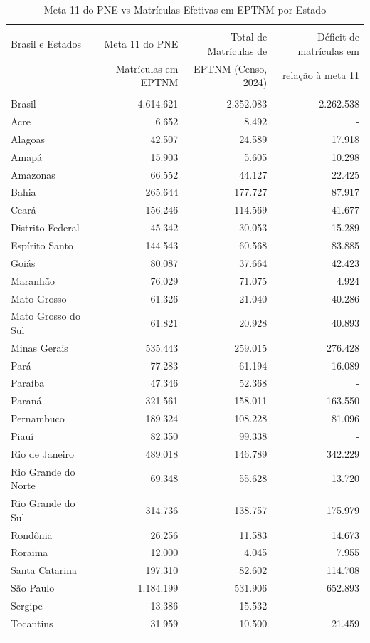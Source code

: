 \begin{table}[!htbp] \centering 
	\caption{Meta 11 do PNE vs Matrículas Efetivas em EPTNM por Estado}
	\label{tab:meta11deficit}
	\footnotesize
	\begin{tabular}{@{\extracolsep{5pt}} lrrr} 
		\\[-1.8ex]\hline 
		\hline \\[-1.8ex] 
		Brasil e Estados & Meta 11 do PNE & Total de Matrículas de & Déficit de matrículas em \\
		& Matrículas em EPTNM & EPTNM (Censo, 2024) & relação à meta 11 \\ 
		\hline \\[-1.8ex] 
		Brasil & 4.614.621 & 2.352.083 & 2.262.538 \\ 
		Acre & 6.652 & 8.492 & - \\ 
		Alagoas & 42.507 & 24.589 & 17.918 \\ 
		Amapá & 15.903 & 5.605 & 10.298 \\ 
		Amazonas & 66.552 & 44.127 & 22.425 \\ 
		Bahia & 265.644 & 177.727 & 87.917 \\ 
		Ceará & 156.246 & 114.569 & 41.677 \\ 
		Distrito Federal & 45.342 & 30.053 & 15.289 \\ 
		Espírito Santo & 144.543 & 60.568 & 83.885 \\ 
		Goiás & 80.087 & 37.664 & 42.423 \\ 
		Maranhão & 76.029 & 71.075 & 4.924 \\ 
		Mato Grosso & 61.326 & 21.040 & 40.286 \\ 
		Mato Grosso do Sul & 61.821 & 20.928 & 40.893 \\ 
		Minas Gerais & 535.443 & 259.015 & 276.428 \\ 
		Pará & 77.283 & 61.194 & 16.089 \\ 
		Paraíba & 47.346 & 52.368 & - \\ 
		Paraná & 321.561 & 158.011 & 163.550 \\ 
		Pernambuco & 189.324 & 108.228 & 81.096 \\ 
		Piauí & 82.350 & 99.338 & - \\ 
		Rio de Janeiro & 489.018 & 146.789 & 342.229 \\ 
		Rio Grande do Norte & 69.348 & 55.628 & 13.720 \\ 
		Rio Grande do Sul & 314.736 & 138.757 & 175.979 \\ 
		Rondônia & 26.256 & 11.583 & 14.673 \\ 
		Roraima & 12.000 & 4.045 & 7.955 \\ 
		Santa Catarina & 197.310 & 82.602 & 114.708 \\ 
		São Paulo & 1.184.199 & 531.906 & 652.893 \\ 
		Sergipe & 13.386 & 15.532 & - \\ 
		Tocantins & 31.959 & 10.500 & 21.459 \\ 
		\hline \\[-1.8ex] 
	\end{tabular} 
\end{table}

